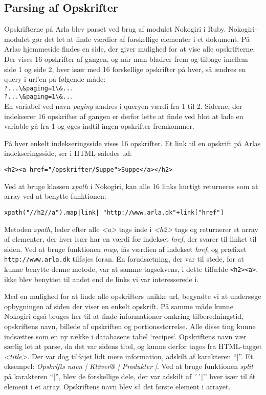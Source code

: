 \subsection{Parsing af Opskrifter}
Opskrifterne på Arla blev parset ved brug af modulet Nokogiri i Ruby. Nokogiri-modulet gør det let at finde værdier af forskellige elementer i et dokument. På Arlas hjemmeside findes en side, der giver mulighed for at vise alle opskrifterne. Der vises 16 opskrifter af gangen, og når man bladrer frem og tilbage imellem side 1 og side 2, hver især med 16 forskellige opskrifter på hver, så ændres en query i url'en på følgende måde: \\
\lstinline{?...\&paging=1\&...} \\
\lstinline{?...\&paging=1\&...} \\
En variabel ved navn \textit{paging} ændres i queryen værdi fra 1 til 2. Siderne, der indekserer 16 opskrifter af gangen er derfor lette at finde ved blot at lade en variable gå fra 1 og øges indtil ingen opskrifter fremkommer.

På hver enkelt indekseringsside vises 16 opskrifter. Et link til en opskrift på Arlas indekseringsside, ser i HTML således ud:

\lstinline{<h2><a href="/opskrifter/Suppe">Suppe</a></h2>}

Ved at bruge klassen \textit{xpath} i Nokogiri, kan alle 16 links hurtigt returneres som at array ved at benytte funktionen:

\texttt{xpath("//h2//a").map{|link| "http://www.arla.dk"+link["href"]}}

Metoden \textit{xpath}, leder efter alle \textit{<a>} tags inde i \textit{<h2>} tags og returnerer et array af elementer, der hver især har en værdi for indekset \textit{href}, der svarer til linket til siden. Ved at bruge funktionen \textit{map}, fås værdien af indekset \textit{href}, og præfixet \texttt{http://www.arla.dk} tilføjes foran. En forudsætning, der var til stede, for at kunne benytte denne metode, var at samme tagsekvens, i dette tilfælde \lstinline{<h2><a>}, ikke blev benyttet til andet end de links vi var interesserede i.

Med en mulighed for at finde alle opskrifters unikke url, begyndte vi at undersøge opbygningen af siden der viser en enkelt opskrift.
På samme måde kunne Nokogiri også bruges her til at finde informationer omkring tilberedningstid, opskriftens navn, billede af opskriften og portionsstørrelse. Alle disse ting kunne indsættes som en ny række i databasens tabel `recipes`. Opskriftens navn vær særlig let at parse, da det var sidens titel, og kunne derfor tages fra HTML-tagget \textit{<title>}. Der var dog tilføjet lidt mere information, adskilt af karakteren ``|''. Et eksempel: \textit{Opskrifts navn | Kløver® | Produkter |}. Ved at bruge funktionen \textit{split} på karakteren ``|'', blev de forskellige dele, der var adskilt af ´´|'' hver især til ét element i et array. Opskriftens navn blev så det første element i arrayet.

